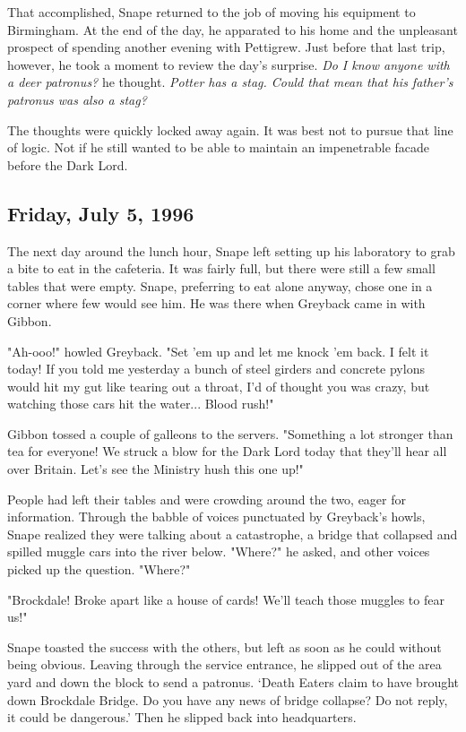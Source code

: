 \documentclass[a4paper,11pt]{article}
\begin{document}
That accomplished, Snape returned to the job of moving his equipment to Birmingham. At the end of the day, he apparated to his home and the unpleasant prospect of spending another evening with Pettigrew. Just before that last trip, however, he took a moment to review the day's surprise. \emph{Do I know anyone with a deer patronus?} he thought. \emph{Potter has a stag. Could that mean that his father's patronus was also a stag?}

The thoughts were quickly locked away again. It was best not to pursue that line of logic. Not if he still wanted to be able to maintain an impenetrable facade before the Dark Lord.

\subsection{Friday, July 5, 1996}

The next day around the lunch hour, Snape left setting up his laboratory to grab a bite to eat in the cafeteria. It was fairly full, but there were still a few small tables that were empty. Snape, preferring to eat alone anyway, chose one in a corner where few would see him. He was there when Greyback came in with Gibbon.

"Ah-ooo!" howled Greyback. "Set 'em up and let me knock 'em back. I felt it today! If you told me yesterday a bunch of steel girders and concrete pylons would hit my gut like tearing out a throat, I'd of thought you was crazy, but watching those cars hit the water... Blood rush!"

Gibbon tossed a couple of galleons to the servers. "Something a lot stronger than tea for everyone! We struck a blow for the Dark Lord today that they'll hear all over Britain. Let's see the Ministry hush this one up!"

People had left their tables and were crowding around the two, eager for information. Through the babble of voices punctuated by Greyback's howls, Snape realized they were talking about a catastrophe, a bridge that collapsed and spilled muggle cars into the river below. "Where?" he asked, and other voices picked up the question. "Where?"

"Brockdale! Broke apart like a house of cards! We'll teach those muggles to fear us!"

Snape toasted the success with the others, but left as soon as he could without being obvious. Leaving through the service entrance, he slipped out of the area yard and down the block to send a patronus. `Death Eaters claim to have brought down Brockdale Bridge. Do you have any news of bridge collapse? Do not reply, it could be dangerous.' Then he slipped back into headquarters.
\end{document}
